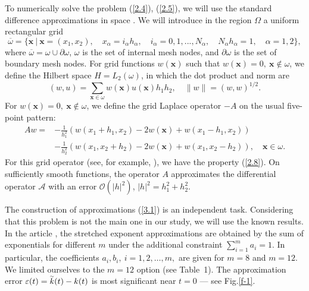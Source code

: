 \documentclass[3p]{elsarticle}
\numberwithin{equation}{section}
\begin{document}
To numerically solve the problem (\ref{2.4}), (\ref{2.5}), we will use the standard
difference approximations in space \cite{SamarskiiTheory}.
We will introduce in the region $\Omega$ a uniform rectangular grid
\[
\overline{\omega}  = \{ \bm{x} \ | \ \bm{x} =\left(x_1, x_2\right), \quad x_\alpha  =
i_\alpha  h_\alpha , \quad i_\alpha  = 0,1,...,N_\alpha ,
\quad N_\alpha  h_\alpha  = 1 , \quad  \alpha  = 1,2 \} ,
\]
where $\overline{\omega} = \omega \cup \partial \omega$, 
$\omega$ is the set of internal mesh nodes, and $\partial \omega$ is the set of boundary mesh nodes.
For grid functions $w(\bm x)$ such that $w(\bm x) = 0, \ \bm x \notin \omega$, we define the Hilbert space
$H = L_2 (\omega)$, in which the dot product and norm are
\[
(w, u) = \sum_{\bm x \in  \omega} w(\bm{x}) u(\bm{x}) h_1 h_2,  \quad 
\| w \| =  (w,w)^{1/2}.
\]
For $w(\bm x) = 0, \ \bm x \notin \omega$, we define the grid Laplace operator $- A$ on the usual five-point pattern:
\[
  \begin{split}
  A w = & -
  \frac{1}{h_1^2} (w(x_1+h_1,x_2) - 2 w(\bm{x}) + w(x_1-h_1,x_2)) \\ 
  & - \frac{1}{h_2^2} (w(x_1,x_2+h_2) - 2 w(\bm{x}) + w(x_1,x_2-h_2)), 
  \quad \bm{x} \in \omega . 
 \end{split} 
\] 
For this grid operator (see, for example, \cite{SamarskiiTheory}), we have the property (\ref{2.8}).
On sufficiently smooth functions, the operator $A$ approximates the differential operator
$\mathcal{A}$ with an error
$\mathcal{O} \left(|h|^2\right)$, $|h|^2 = h_1^2+h_2^2$. 

The construction of approximations (\ref{3.1}) is an independent task.
Considering that this problem is not the main one in our study, we will use the known results.
In the article \cite{mauro2018prony}, the stretched exponent approximations are obtained by the sum of exponentials for different $m$ under the additional constraint $\sum_{i=1}^{m}a_i = 1$.
In particular, the coefficients $a_i, b_i, \ i =1,2,\ldots, m,$ are given for $m = 8$ and $m = 12$.
We limited ourselves to the $m = 12$ option (see Table~1).
The approximation error $\varepsilon (t) = \accentset{\sim }{k}(t) - k(t)$ is most significant near $t = 0$ --- see  Fig.\ref{f-1}. 
\end{document}
